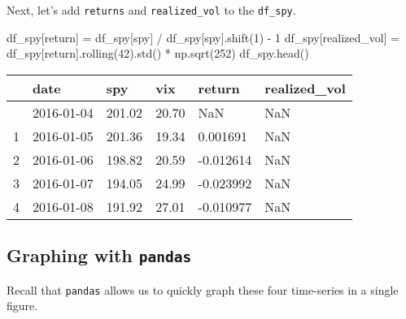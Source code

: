 \documentclass[
  letterpaper,
  DIV=11,
  numbers=noendperiod]{scrreprt}
\newenvironment{Shaded}{\begin{snugshade}}{\end{snugshade}}
\newcommand{\DecValTok}[1]{\textcolor[rgb]{0.68,0.00,0.00}{#1}}
\newcommand{\NormalTok}[1]{\textcolor[rgb]{0.00,0.23,0.31}{#1}}
\newcommand{\OperatorTok}[1]{\textcolor[rgb]{0.37,0.37,0.37}{#1}}
\newcommand{\StringTok}[1]{\textcolor[rgb]{0.13,0.47,0.30}{#1}}
\begin{document}
Next, let's add \texttt{returns} and \texttt{realized\_vol} to the
\texttt{df\_spy}.

\begin{Shaded}
\begin{Highlighting}[]
\NormalTok{df\_spy[}\StringTok{\textquotesingle{}return\textquotesingle{}}\NormalTok{] }\OperatorTok{=}\NormalTok{ df\_spy[}\StringTok{\textquotesingle{}spy\textquotesingle{}}\NormalTok{] }\OperatorTok{/}\NormalTok{ df\_spy[}\StringTok{\textquotesingle{}spy\textquotesingle{}}\NormalTok{].shift(}\DecValTok{1}\NormalTok{) }\OperatorTok{{-}} \DecValTok{1}
\NormalTok{df\_spy[}\StringTok{\textquotesingle{}realized\_vol\textquotesingle{}}\NormalTok{] }\OperatorTok{=}\NormalTok{ df\_spy[}\StringTok{\textquotesingle{}return\textquotesingle{}}\NormalTok{].rolling(}\DecValTok{42}\NormalTok{).std() }\OperatorTok{*}\NormalTok{ np.sqrt(}\DecValTok{252}\NormalTok{)}
\NormalTok{df\_spy.head()}
\end{Highlighting}
\end{Shaded}

\begin{longtable}[]{@{}llllll@{}}
\toprule\noalign{}
& date & spy & vix & return & realized\_vol \\
\midrule\noalign{}
\endhead
\bottomrule\noalign{}
\endlastfoot
0 & 2016-01-04 & 201.02 & 20.70 & NaN & NaN \\
1 & 2016-01-05 & 201.36 & 19.34 & 0.001691 & NaN \\
2 & 2016-01-06 & 198.82 & 20.59 & -0.012614 & NaN \\
3 & 2016-01-07 & 194.05 & 24.99 & -0.023992 & NaN \\
4 & 2016-01-08 & 191.92 & 27.01 & -0.010977 & NaN \\
\end{longtable}

\hypertarget{graphing-with-pandas}{%
\subsection{\texorpdfstring{Graphing with
\texttt{pandas}}{Graphing with pandas}}\label{graphing-with-pandas}}

Recall that \texttt{pandas} allows us to quickly graph these four
time-series in a single figure.
\end{document}
